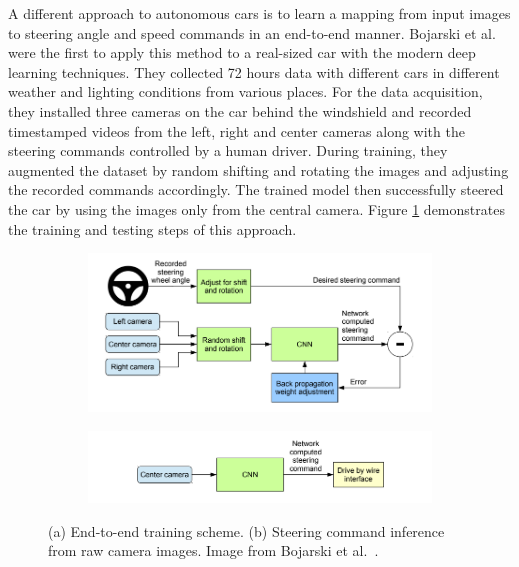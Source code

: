 A different approach to autonomous cars is to learn a mapping from input images
to steering angle and speed commands in an end-to-end manner. Bojarski et al.\
\cite{Bojarski2016EndTE} were the first to apply this method to a real-sized
car with the modern deep learning techniques. They collected 72 hours data with
different cars in different weather and lighting conditions from various
places. For the data acquisition, they installed three cameras on the car
behind the windshield and recorded timestamped videos from the left, right and
center cameras along with the steering commands controlled by a human driver.
During training, they augmented the dataset by random shifting and rotating the
images and adjusting the recorded commands accordingly. The trained model then
successfully steered the car by using the images only from the central camera.
Figure \ref{figure:end-to-end-network} demonstrates the training and testing
steps of this approach.

\begin{figure}[h]
  \centering
  \begin{subfigure}[b]{1.0\linewidth}
    \includegraphics[width=\linewidth]{figures/end-to-end-training.png}
    \caption{}
  \end{subfigure}
  \begin{subfigure}[b]{1.0\linewidth}
    \includegraphics[width=\linewidth]{figures/end-to-end-inference.png}
    \caption{}
  \end{subfigure}
  \caption[End-to-end training and inference]{(a) End-to-end training scheme.
    (b) Steering command inference from raw camera images. Image from
    Bojarski et al.\ \cite{Bojarski2016EndTE}.}
  \label{figure:end-to-end-network}
\end{figure}

